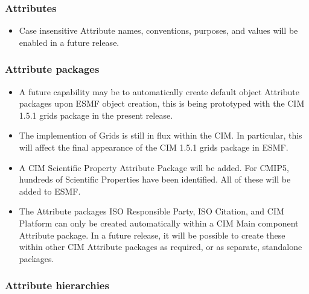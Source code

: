 %


\subsubsection{Attributes}

\begin{itemize}
\item Case insensitive Attribute names, conventions, purposes, and values will be enabled in a future release.
\end{itemize}


\subsubsection{Attribute packages}

\begin{itemize}
\item A future capability may be to automatically create default object Attribute packages upon ESMF object creation, this is being prototyped with the CIM 1.5.1 grids package in the present release.
\item The implemention of Grids is still in flux within the CIM.  In particular, this will affect the final appearance of the CIM 1.5.1 grids package in ESMF.
\item A CIM Scientific Property Attribute Package will be added. For CMIP5, hundreds of Scientific Properties have been identified. All of these will be added to ESMF. 
\item The Attribute packages ISO Responsible Party, ISO Citation, and CIM Platform can only be created automatically within a CIM Main component Attribute package.  In a future release, it will be possible to create these within other CIM Attribute packages as required, or as separate, standalone packages.
\end{itemize}


\subsubsection{Attribute hierarchies}


